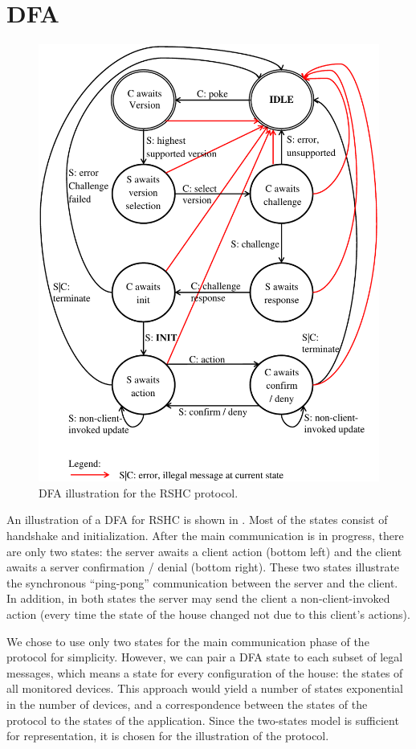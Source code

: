 \section{DFA}
\label{sec:dfa}

\begin{figure}[h]
  \centering
  \includegraphics[width=4.95in]{figures/dfa.pdf}
  \caption{DFA illustration for the RSHC protocol.}
  \label{fig:dfa:dfa}
\end{figure}

An illustration of a DFA for RSHC is shown in . Most of the states consist of handshake and initialization. After the main communication is in progress, there are only two states: the server awaits a client action (bottom left) and the client awaits a server confirmation / denial (bottom right). These two states illustrate the synchronous ``ping-pong'' communication between the server and the client. In addition, in both states the server may send the client a non-client-invoked action (every time the state of the house changed not due to this client's actions).

We chose to use only two states for the main communication phase of the protocol for simplicity. However, we can pair a DFA state to each subset of legal messages, which means a state for every configuration of the house: the states of all monitored devices. This approach would yield a number of states exponential in the number of devices, and a correspondence between the states of the protocol to the states of the application. Since the two-states model is sufficient for representation, it is chosen for the illustration of the protocol.
